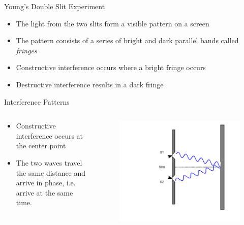 \begin{frame}[c]{Young's Double Slit Experiment}
    \begin{itemize}
        \setlength\itemsep{0.3cm}
        \item The light from the two slits form a visible pattern on a screen
        \item The pattern consists of a series of bright and dark parallel bands called \textit{fringes}
        \item Constructive interference occurs where a bright fringe occurs
        \item Destructive interference results in a dark fringe
    \end{itemize}
\end{frame}

\begin{frame}{Interference Patterns}
    \vspace{-1cm}
    \begin{columns}[c, onlytextwidth]
        \begin{column}{0.5\textwidth}
            \begin{itemize}
                \item Constructive interference occurs at the center point
                \item The two waves travel the same distance and arrive in phase, i.e. arrive at the same time.
            \end{itemize}
        \end{column}\begin{column}{0.5\textwidth}
            \begin{figure}
                \centering{}
                \includegraphics[height=1\textheight, trim={5cm  0 2cm 0},clip]{images/bright.pdf}
            \end{figure}
        \end{column}
    \end{columns}
\end{frame}

